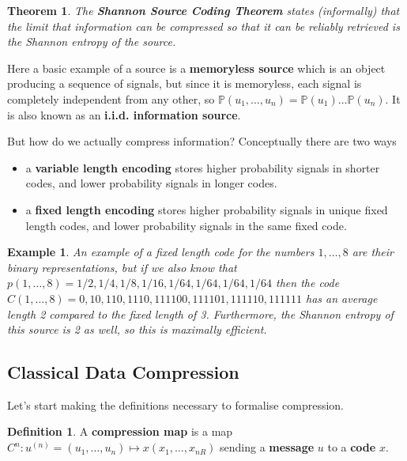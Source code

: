 \documentclass{article}
\newtheorem{example}{Example}
\newtheorem{theorem}{Theorem}
\theoremstyle{definition}
\newtheorem{definition}{Definition}
\begin{document}
\begin{theorem}
  The \textbf{Shannon Source Coding Theorem} states (informally) that the limit
  that information can be compressed so that it can be reliably retrieved is the
  Shannon entropy of the source.
\end{theorem}

Here a basic example of a source is a \textbf{memoryless source} which is an
object producing a sequence of signals, but since it is memoryless, each signal
is completely independent from any other, so $\mathbb{P}(u_1, \dots, u_n) =
\mathbb{P}(u_1) \dots \mathbb{P}(u_n)$. It is also known as an \textbf{i.i.d.
  information source}.

But how do we actually compress information? Conceptually there are two ways

\begin{itemize}
\item a \textbf{variable length encoding} stores higher probability signals in
  shorter codes, and lower probability signals in longer codes.
\item a \textbf{fixed length encoding} stores higher probability signals in
  unique fixed length codes, and lower probability signals in the same fixed
  code. 
\end{itemize}

\begin{example}
  An example of a fixed length code for the numbers $1, \dots, 8$ are their
  binary representations, but if we also know that $p(1, \dots, 8) = 1/2, 1/4,
  1/8, 1/16, 1/64, 1/64, 1/64, 1/64$ then the code $C(1, \dots, 8) = 0, 10, 110,
  1110, 111100, 111101, 111110, 111111$ has an average length 2 compared to the
  fixed length of 3. Furthermore, the Shannon entropy of this source is 2 as
  well, so this is maximally efficient.
\end{example}

\subsection{Classical Data Compression}

Let's start making the definitions necessary to formalise compression.

\begin{definition}
  A \textbf{compression map} is a map $C^n : u^{(n)} = (u_1, \dots, u_n) \mapsto
  x(x_1, \dots, x_{nR})$ sending a \textbf{message} $u$ to a \textbf{code} $x$.
\end{definition}
\end{document}
